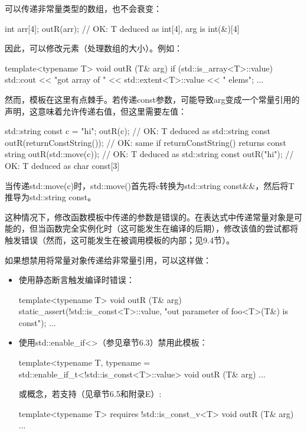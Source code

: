 可以传递非常量类型的数组，也不会衰变：

\begin{cpp}
int arr[4];
outR(arr); // OK: T deduced as int[4], arg is int(&)[4]
\end{cpp}

因此，可以修改元素（处理数组的大小）。例如：

\begin{cpp}
template<typename T>
void outR (T& arg) {
	if (std::is_array<T>::value) {
		std::cout << "got array of " << std::extent<T>::value << " elems\n";
	}
	...
}
\end{cpp}

然而，模板在这里有点棘手。若传递const参数，可能导致arg变成一个常量引用的声明，这意味着允许传递右值，但这里需要左值：

\begin{cpp}
std::string const c = "hi";
outR(c); // OK: T deduced as std::string const
outR(returnConstString()); // OK: same if returnConstString() returns const string
outR(std::move(c)); // OK: T deduced as std::string const
outR("hi"); // OK: T deduced as char const[3]
\end{cpp}

\begin{notice}
当传递std::move(c)时，std::move()首先将c转换为std::string const\&\&，然后将T推导为std::string const。
\end{notice}

这种情况下，修改函数模板中传递的参数是错误的。在表达式中传递常量对象是可能的，但当函数完全实例化时（这可能发生在编译的后期），修改该值的尝试都将触发错误（然而，这可能发生在被调用模板的内部；见9.4节）。

如果想禁用将常量对象传递给非常量引用，可以这样做：

\begin{itemize}
\item 
使用静态断言触发编译时错误：

\begin{cpp}
template<typename T>
void outR (T& arg) {
	static_assert(!std::is_const<T>::value,
				  "out parameter of foo<T>(T&) is const");
	...
}
\end{cpp}

\item 
使用std::enable\_if<>（参见章节6.3）禁用此模板：

\begin{cpp}
template<typename T,
		 typename = std::enable_if_t<!std::is_const<T>::value>
void outR (T& arg) {
	...
}
\end{cpp}

或概念，若支持（见章节6.5和附录E）:

\begin{cpp}
template<typename T>
requires !std::is_const_v<T>
void outR (T& arg) {
	...
}
\end{cpp}

\end{itemize}

